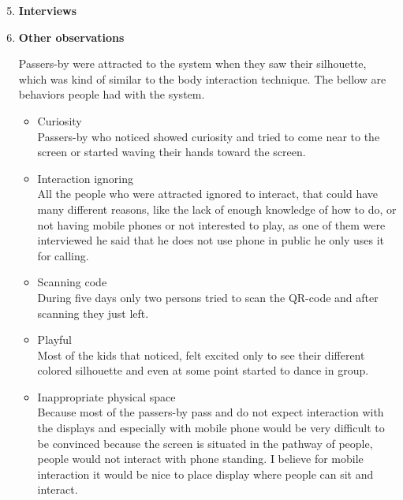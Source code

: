 \begin{enumerate}
\setcounter{enumi}{4}

\item \textbf{Interviews}



\newpage
\item \textbf{Other observations}


Passers-by were attracted to the system when they saw their silhouette, which was kind of similar to the body interaction technique. The bellow are behaviors people had with the system.

\begin{itemize}
\item Curiosity \\
Passers-by who noticed showed curiosity and tried to come near to the screen or started waving their hands toward the screen.
 
\item Interaction ignoring \\
All the people who were attracted ignored to interact, that could have many different reasons, like the lack of enough knowledge of how to do, or not having mobile phones or not interested to play, as one of them were interviewed he said that he does not use phone in public he only uses it for calling. 

\item Scanning code \\ 
During five days only two persons tried to scan the QR-code and after scanning they just left.

\item Playful   \\
Most of the kids that noticed, felt excited only to see their different colored silhouette and even at some point started to dance in group. 



\item Inappropriate physical space \\
Because most of the passers-by pass and do not expect interaction with the displays and especially with mobile phone would be very difficult to be convinced because the screen is situated in the pathway of people, people would not interact with phone standing. I believe for mobile interaction it would be nice to place display where people can sit and interact.


\end{itemize}
\end{enumerate}
